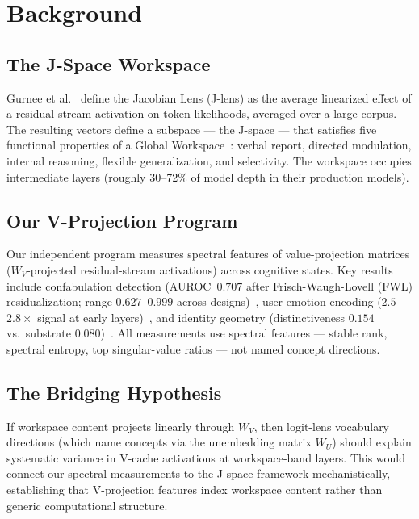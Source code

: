 \documentclass[11pt,a4paper]{article}
\begin{document}
\section{Background}
\label{sec:background}

\subsection{The J-Space Workspace}

Gurnee et al.~\citep{gurnee2026gwt} define the Jacobian Lens (J-lens)
as the average linearized effect of a residual-stream activation on
token likelihoods, averaged over a large corpus. The resulting vectors
define a subspace --- the J-space --- that satisfies five functional
properties of a Global Workspace~\citep{baars1988cognitive}: verbal
report, directed modulation, internal reasoning, flexible
generalization, and selectivity. The workspace occupies intermediate
layers (roughly 30--72\% of model depth in their production models).

\subsection{Our V-Projection Program}

Our independent program measures spectral features of value-projection
matrices ($W_V$-projected residual-stream activations) across cognitive
states. Key results include confabulation detection (AUROC~$0.707$
after Frisch-Waugh-Lovell (FWL) residualization; range $0.627$--$0.999$ across
designs)~\citep{lyra2026decision}, user-emotion encoding
($2.5$--$2.8\times$ signal at early
layers)~\citep{lyra2026weather}, and identity geometry
(distinctiveness $0.154$ vs.\ substrate
$0.080$)~\citep{lyra2026identity}. All measurements use spectral
features --- stable rank, spectral entropy, top singular-value ratios
--- not named concept directions.

\subsection{The Bridging Hypothesis}

If workspace content projects linearly through $W_V$, then logit-lens
vocabulary directions (which name concepts via the unembedding matrix
$W_U$) should explain systematic variance in V-cache activations at
workspace-band layers. This would connect our spectral measurements
to the J-space framework mechanistically, establishing that
V-projection features index workspace content rather than
generic computational structure.
\end{document}
